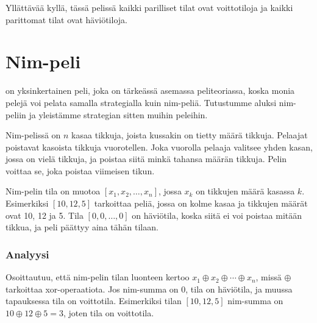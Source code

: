 \begin{center}
\end{center}

Yllättävää kyllä, tässä pelissä kaikki
parilliset tilat ovat voittotiloja ja
kaikki parittomat tilat ovat häviötiloja.

\section{Nim-peli}


 on yksinkertainen peli,
joka on tärkeässä asemassa peliteoriassa,
koska monia pelejä voi pelata samalla
strategialla kuin nim-peliä.
Tutustumme aluksi nim-peliin ja yleistämme
strategian sitten muihin peleihin.

Nim-pelissä on $n$ kasaa tikkuja,
joista kussakin on tietty määrä tikkuja.
Pelaajat poistavat kasoista tikkuja vuorotellen.
Joka vuorolla pelaaja valitsee yhden kasan,
jossa on vielä tikkuja,
ja poistaa siitä minkä tahansa määrän tikkuja.
Pelin voittaa se, joka poistaa viimeisen tikun.

Nim-pelin tila on muotoa $[x_1,x_2,\ldots,x_n]$,
jossa $x_k$ on tikkujen määrä kasassa $k$.
Esimerkiksi $[10,12,5]$ tarkoittaa peliä,
jossa on kolme kasaa ja tikkujen määrät ovat 10, 12 ja 5.
Tila $[0,0,\ldots,0]$ on häviötila,
koska siitä ei voi poistaa mitään tikkua,
ja peli päättyy aina tähän tilaan.

\subsubsection{Analyysi}
Osoittautuu, että nim-pelin tilan luonteen
kertoo  $x_1 \oplus x_2 \oplus \cdots \oplus x_n$,
missä $\oplus$ tarkoittaa xor-operaatiota.
Jos nim-summa on 0, tila on häviötila,
ja muussa tapauksessa tila on voittotila.
Esimerkiksi tilan $[10,12,5]$ nim-summa on
$10 \oplus 12 \oplus 5 = 3$, joten tila on voittotila.

